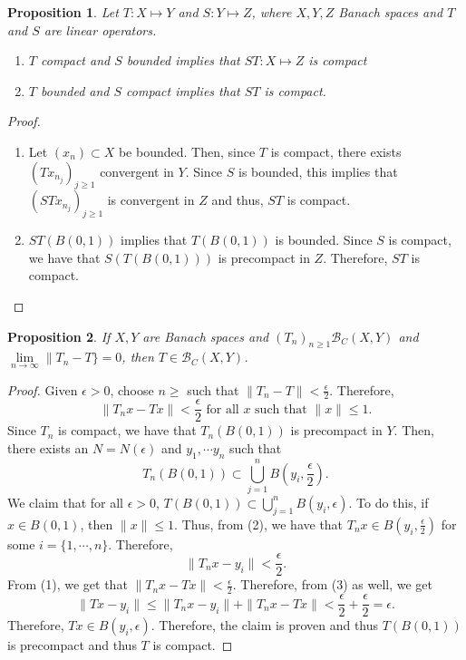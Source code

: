 \documentclass[12pt]{article}
\newtheorem{proposition}{Proposition}
\newcommand{\B}{\mathscr{B}}
\newcommand{\sbs}{\subset}
\begin{document}
\begin{proposition}
Let $T:X \mapsto Y$ and $S: Y \mapsto Z$, where $X, Y, Z$ Banach spaces and $T$ and $S$ are linear operators. 
\begin{enumerate}[topsep=-15pt, itemsep=0pt]
\item[(a)] $T$ compact and $S$ bounded implies that $ST: X \mapsto Z$ is compact
\item[(b)] $T$ bounded and $S$ compact implies that $ST$ is compact. 
\end{enumerate}
\end{proposition}
\vspace{-25pt}
\begin{proof}
\begin{enumerate}[topsep=-15pt, itemsep=0pt]
\item[(a)] Let $(x_n) \sbs X$ be bounded. Then, since $T$ is compact, there exists $(Tx_{n_j})_{j \geq 1}$ convergent in $Y$. Since $S$ is bounded, this implies that $(STx_{n_j})_{j \geq 1}$ is convergent in $Z$ and thus, $ST$ is compact.
\item[(b)] $ST(B(0,1))$ implies that $T(B(0,1))$ is bounded. Since $S$ is compact, we have that $S(T(B(0,1)))$ is precompact in $Z$. Therefore, $ST$ is compact. 
\end{enumerate}
\vspace{-25pt}
\end{proof}
\begin{proposition}
If $X, Y$ are Banach spaces and $(T_n)_{n \geq 1} \B_C(X, Y)$ and $\lim\limits_{n \to \infty} \| T_n - T \} = 0$, then $T \in \B_C(X, Y)$. 
\end{proposition}
\vspace{-25pt}
\setcounter{equation}{0}
\begin{proof}
Given $\epsilon > 0$, choose $n \geq $ such that $\| T_n - T \| < \frac{\epsilon}{2}$. Therefore, 
\begin{equation}
\| T_n x - T x \| < \frac{\epsilon}{2} \text{ for all } x \text{ such that } \| x \| \leq 1. 
\end{equation}
Since $T_n$ is compact, we have that $T_n(B(0,1))$ is precompact in $Y$. Then, there exists an $N = N(\epsilon)$ and $y_1, \cdots y_n$ such that 
\begin{equation}
 T_n(B(0, 1)) \sbs \bigcup_{j = 1}^n B\left( y_i, \frac{\epsilon}{2}\right).
 \end{equation}
We claim that for all $\epsilon > 0$, $T(B(0, 1)) \sbs \bigcup_{j = 1}^n B\left( y_i, \epsilon\right)$. To do this, if $x \in B(0, 1)$, then $\| x \| \leq 1$. Thus, from (2), we have that $T_n x \in B(y_i, \frac{\epsilon}{2})$ for some $i = \{ 1, \cdots, n\}$. Therefore, 
\begin{equation}
\| T_n x - y_i \| < \frac{\epsilon}{2}.
\end{equation}  
From (1), we get that $\| T_n x - Tx \| < \frac{\epsilon}{2}$. Therefore, from (3) as well, we get 
\[ \| Tx - y_i \| \leq \| T_n x- y_i \| + \| T_n x - T x\| < \frac{\epsilon}{2} + \frac{\epsilon}{2} = \epsilon.\]
Therefore, $Tx \in B(y_i, \epsilon)$. Therefore, the claim is proven and thus $T(B(0, 1))$ is precompact and thus $T$ is compact.
\end{proof}
\end{document}
